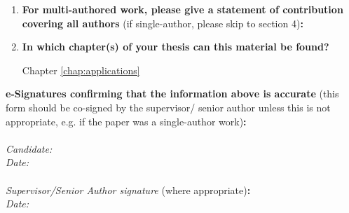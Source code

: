 {\begin{enumerate}[leftmargin=*,label={\bfseries\arabic*.}]
\begin{enumerate}[label={\alph*)}]
	\item \textbf{Has the manuscript been uploaded to a preprint server `e.g. medRxiv'?
	\\
	If `Yes', please please give a link or doi:}

	Yes, \url{https://www.researchgate.net/publication/367116849_Stability_of_white_matter_tract_segmentation_methods_with_decreasing_data_quality}
	\item \textbf{Where is the work intended to be published?}

	N/A
	\item \textbf{List the manuscript's authors in the intended authorship order:}

	\item \textbf{Stage of publication:}

	Work presented at conference, no proceedings published.
\end{enumerate}

\item \textbf{For multi-authored work, please give a statement of contribution covering all authors} (if single-author, please skip to section 4)\textbf{:}
\item \textbf{In which chapter(s) of your thesis can this material be found?}

Chapter \ref{chap:applications}
\end{enumerate}

\textbf{e-Signatures confirming that the information above is accurate}
(this form should be co-signed by the supervisor/ senior author unless this is not appropriate, e.g. if the paper was a single-author work)\textbf{:}\\
\\[\baselineskip]
\textit{Candidate:}
\\[\baselineskip]
\textit{Date:}\\\signdate
\\[\baselineskip]
\textit{Supervisor/Senior Author signature} (where appropriate)\textbf{:}
\\[\baselineskip]
\textit{Date:}\\\signdate
%
}%
